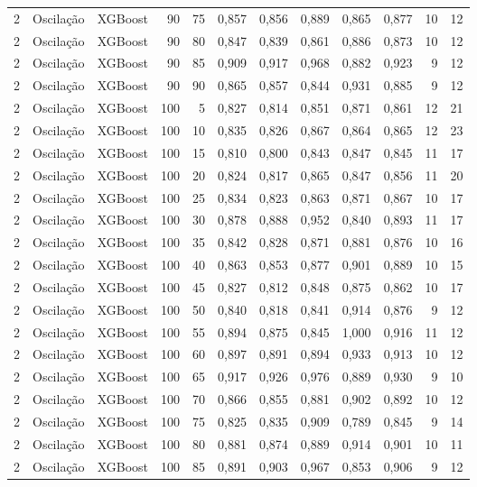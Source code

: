 \begin{longtable}{@{}rllrrrrrrrrr@{}}
2 & Oscilação & XGBoost & 90 & 75 & 0,857 & 0,856 & 0,889 & 0,865 & 0,877 & 10 & 12 \\
2 & Oscilação & XGBoost & 90 & 80 & 0,847 & 0,839 & 0,861 & 0,886 & 0,873 & 10 & 12 \\
2 & Oscilação & XGBoost & 90 & 85 & 0,909 & 0,917 & 0,968 & 0,882 & 0,923 & 9 & 12 \\
2 & Oscilação & XGBoost & 90 & 90 & 0,865 & 0,857 & 0,844 & 0,931 & 0,885 & 9 & 12 \\
2 & Oscilação & XGBoost & 100 & 5 & 0,827 & 0,814 & 0,851 & 0,871 & 0,861 & 12 & 21 \\
2 & Oscilação & XGBoost & 100 & 10 & 0,835 & 0,826 & 0,867 & 0,864 & 0,865 & 12 & 23 \\
2 & Oscilação & XGBoost & 100 & 15 & 0,810 & 0,800 & 0,843 & 0,847 & 0,845 & 11 & 17 \\
2 & Oscilação & XGBoost & 100 & 20 & 0,824 & 0,817 & 0,865 & 0,847 & 0,856 & 11 & 20 \\
2 & Oscilação & XGBoost & 100 & 25 & 0,834 & 0,823 & 0,863 & 0,871 & 0,867 & 10 & 17 \\
2 & Oscilação & XGBoost & 100 & 30 & 0,878 & 0,888 & 0,952 & 0,840 & 0,893 & 11 & 17 \\
2 & Oscilação & XGBoost & 100 & 35 & 0,842 & 0,828 & 0,871 & 0,881 & 0,876 & 10 & 16 \\
2 & Oscilação & XGBoost & 100 & 40 & 0,863 & 0,853 & 0,877 & 0,901 & 0,889 & 10 & 15 \\
2 & Oscilação & XGBoost & 100 & 45 & 0,827 & 0,812 & 0,848 & 0,875 & 0,862 & 10 & 17 \\
2 & Oscilação & XGBoost & 100 & 50 & 0,840 & 0,818 & 0,841 & 0,914 & 0,876 & 9 & 12 \\
2 & Oscilação & XGBoost & 100 & 55 & 0,894 & 0,875 & 0,845 & 1,000 & 0,916 & 11 & 12 \\
2 & Oscilação & XGBoost & 100 & 60 & 0,897 & 0,891 & 0,894 & 0,933 & 0,913 & 10 & 12 \\
2 & Oscilação & XGBoost & 100 & 65 & 0,917 & 0,926 & 0,976 & 0,889 & 0,930 & 9 & 10 \\
2 & Oscilação & XGBoost & 100 & 70 & 0,866 & 0,855 & 0,881 & 0,902 & 0,892 & 10 & 12 \\
2 & Oscilação & XGBoost & 100 & 75 & 0,825 & 0,835 & 0,909 & 0,789 & 0,845 & 9 & 14 \\
2 & Oscilação & XGBoost & 100 & 80 & 0,881 & 0,874 & 0,889 & 0,914 & 0,901 & 10 & 11 \\
2 & Oscilação & XGBoost & 100 & 85 & 0,891 & 0,903 & 0,967 & 0,853 & 0,906 & 9 & 12 \\

\end{longtable}
